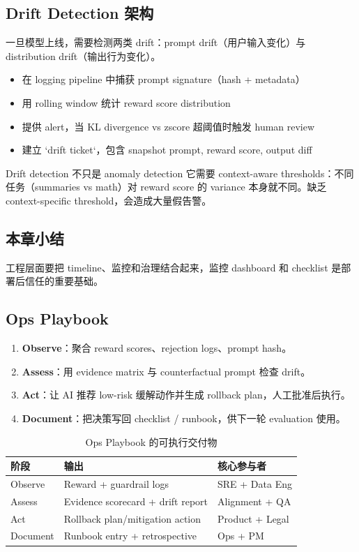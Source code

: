 \documentclass[a4paper]{article}
\begin{document}
\subsection{Drift Detection 架构}

一旦模型上线，需要检测两类 drift：prompt drift（用户输入变化）与 distribution drift（输出行为变化）。

\begin{itemize}
    \item 在 logging pipeline 中捕获 prompt signature（hash + metadata）
    \item 用 rolling window 统计 reward score distribution
    \item 提供 alert，当 KL divergence vs zscore 超阈值时触发 human review
    \item 建立 `drift ticket`，包含 snapshot prompt, reward score, output diff
\end{itemize}

\begin{knowledgebox}{Drift detection 不只是 anomaly detection}
它需要 context-aware thresholds：不同任务（summaries vs math）对 reward score 的 variance 本身就不同。缺乏 context-specific threshold，会造成大量假告警。
\end{knowledgebox}

\subsection{本章小结}

工程层面要把 timeline、监控和治理结合起来，监控 dashboard 和 checklist 是部署后信任的重要基础。
\subsection{Ops Playbook}

\begin{enumerate}
    \item \textbf{Observe}：聚合 reward scores、rejection logs、prompt hash。
    \item \textbf{Assess}：用 evidence matrix 与 counterfactual prompt 检查 drift。
    \item \textbf{Act}：让 AI 推荐 low-risk 缓解动作并生成 rollback plan，人工批准后执行。
    \item \textbf{Document}：把决策写回 checklist / runbook，供下一轮 evaluation 使用。
\end{enumerate}

\begin{table}[H]
\centering
\begin{tabular}{p{} p{} p{}}
\toprule
阶段 & 输出 & 核心参与者 \\
\midrule
Observe & Reward + guardrail logs & SRE + Data Eng \\
Assess & Evidence scorecard + drift report & Alignment + QA \\
Act & Rollback plan/mitigation action & Product + Legal \\
Document & Runbook entry + retrospective & Ops + PM \\
\bottomrule
\end{tabular}
\caption{Ops Playbook 的可执行交付物}
\end{table}
\end{document}
